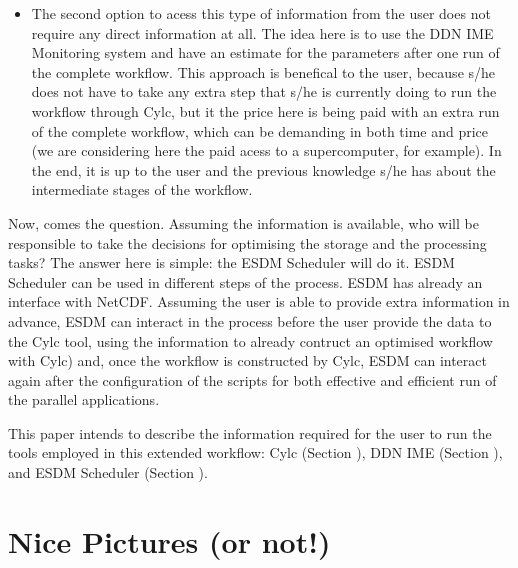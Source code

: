 \documentclass[a4paper]{article}
\begin{document}
\begin{itemize}
\begin{description}
\begin{itemize}
\end{itemize}

\end{description}

\item The second option to acess this type of information from the user does not require any direct information at all. The idea here is to use the DDN IME Monitoring system and have an estimate for the parameters after one run of the complete workflow. This approach is benefical to the user, because s/he does not have to take any extra step that s/he is currently doing to run the workflow through Cylc, but it the price here is being paid with an extra run of the complete workflow, which can be demanding in both time and price (we are considering here the paid acess to a supercomputer, for example). In the end, it is up to the user and the previous knowledge s/he has about the intermediate stages of the workflow.

\end{itemize}

Now, comes the question. Assuming the information is available, who will be responsible to take the decisions for optimising the storage and the processing tasks? The answer here is simple: the ESDM Scheduler will do it. ESDM Scheduler can be used in different steps of the process. ESDM has already an interface with NetCDF. Assuming the user is able to provide extra information in advance, ESDM can interact in the process before the user provide the data to the Cylc tool, using the information to already contruct an optimised workflow with Cylc) and, once the workflow is constructed by Cylc, ESDM can interact again after the configuration of the scripts for both effective and efficient run of the parallel applications.

This paper intends to describe the information required for the user to run the tools employed in this extended workflow: Cylc (Section ), DDN IME (Section ), and ESDM Scheduler (Section ).

\section{Nice Pictures (or not!)}
\end{document}
